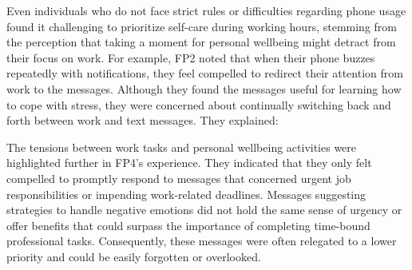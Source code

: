 Even individuals who do not face strict rules or difficulties regarding phone usage found it challenging to prioritize self-care during working hours, stemming from the perception that taking a moment for personal wellbeing might detract from their focus on work. For example, FP2 noted that when their phone buzzes repeatedly with notifications, they feel compelled to redirect their attention from work to the messages. Although they found the messages useful for learning how to cope with stress, they were concerned about continually switching back and forth between work and text messages. They explained: 



The tensions between work tasks and personal wellbeing activities were highlighted further in FP4's experience. They indicated that they only felt compelled to promptly respond to messages that concerned urgent job responsibilities or impending work-related deadlines. Messages suggesting strategies to handle negative emotions did not hold the same sense of urgency or offer benefits that could surpass the importance of completing time-bound professional tasks.
Consequently, these messages were often relegated to a lower priority and could be easily forgotten or overlooked. 



